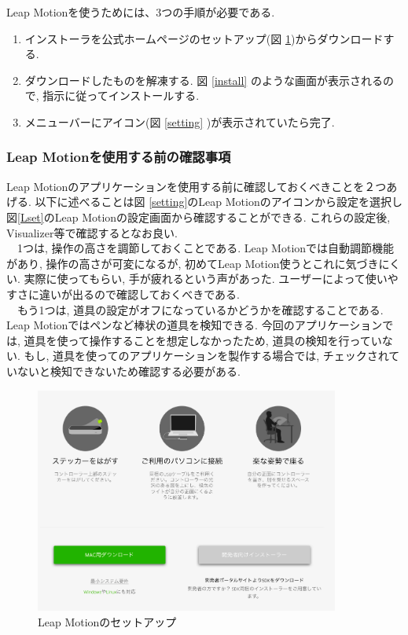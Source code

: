 \documentclass{funthesis}
\begin{document}


Leap Motionを使うためには、3つの手順が必要である. 
\begin{enumerate}
 \item インストーラを公式ホームページのセットアップ(図 \ref{setup})からダウンロードする.
 \item ダウンロードしたものを解凍する. 図 \ref{install} のような画面が表示されるので, 指示に従ってインストールする. 
 \item メニューバーにアイコン(図 \ref{setting} )が表示されていたら完了. 
\end{enumerate}

\subsubsection{Leap Motionを使用する前の確認事項}
Leap Motionのアプリケーションを使用する前に確認しておくべきことを２つあげる. 以下に述べることは図 \ref{setting}のLeap Motionのアイコンから設定を選択し図\ref{Lset}のLeap Motionの設定画面から確認することができる. これらの設定後, Visualizer等で確認するとなお良い. \\
　1つは, 操作の高さを調節しておくことである. Leap Motionでは自動調節機能があり, 操作の高さが可変になるが, 初めてLeap Motion使うとこれに気づきにくい. 実際に使ってもらい, 手が疲れるという声があった. ユーザーによって使いやすさに違いが出るので確認しておくべきである. \\
　もう1つは, 道具の設定がオフになっているかどうかを確認することである. Leap Motionではペンなど棒状の道具を検知できる. 今回のアプリケーションでは, 道具を使って操作することを想定しなかったため, 道具の検知を行っていない. もし, 道具を使ってのアプリケーションを製作する場合では, チェックされていないと検知できないため確認する必要がある. \\

\begin{figure}[H]
 \begin{center}
  \includegraphics[width=100mm]{./img/setup.png}
 \end{center}
 \caption{Leap Motionのセットアップ}
 \label{setup}
\end{figure}
\end{document}
